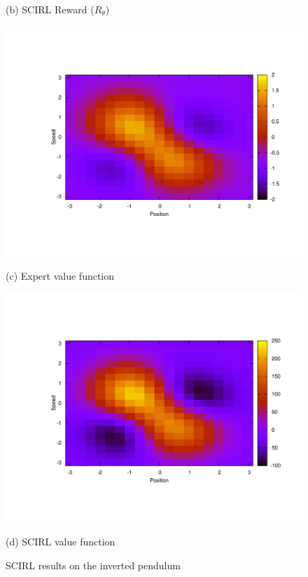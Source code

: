 \documentclass[tablecaption=bottom]{jmlr}
\begin{document}
\begin{figure}[ht]
\begin{center}
\begin{minipage}[b]{.48\linewidth}
  \centerline{(b) SCIRL Reward ($R_\theta$)}%
\end{minipage}
\begin{minipage}[b]{.48\linewidth}
  \centering
  \centerline{\includegraphics[width=\columnwidth]{LAFEM_Exp3_Vexpert.pdf}}
  \centerline{(c) Expert value function}%
\end{minipage}
\hfill
\begin{minipage}[b]{.48\linewidth}
  \centering
  \centerline{\includegraphics[width=\columnwidth]{LAFEM_Exp3_Vagent.pdf}}
  \centerline{(d) SCIRL value function}%
\end{minipage}
%
\caption{SCIRL results on the inverted pendulum} \label{onlyFig.fig}
%
\end{center}
\vskip -0.2in
\end{figure}
\end{document}
